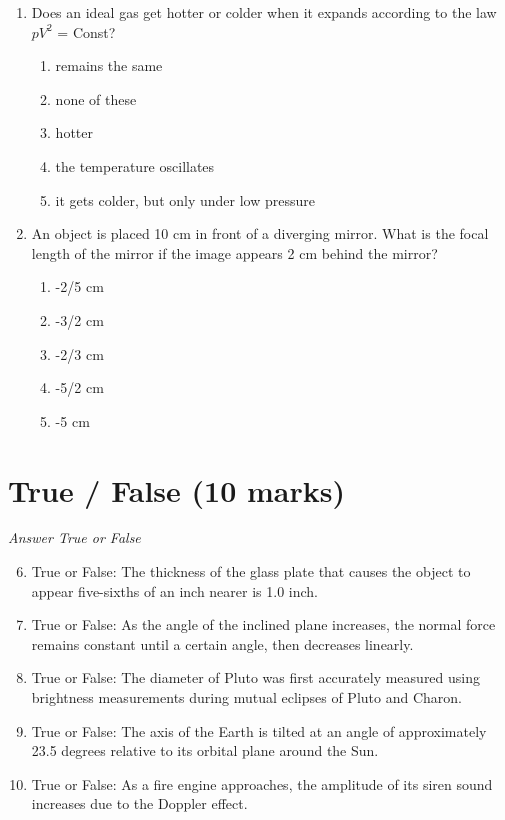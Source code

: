 \documentclass[12pt]{article}
\begin{document}
\begin{enumerate}[label=\arabic*.]
\begin{enumerate}[label=(\alph*)]
    \item only when the charge is at rest
\end{enumerate}
\item Does an ideal gas get hotter or colder when it expands according to the law $pV^2$ = Const?
\begin{enumerate}[label=(\alph*)]
    \item remains the same
    \item none of these
    \item hotter
    \item the temperature oscillates
    \item it gets colder, but only under low pressure
\end{enumerate}
\item An object is placed 10 cm in front of a diverging mirror. What is the focal length of the mirror if the image appears 2 cm behind the mirror?
\begin{enumerate}[label=(\alph*)]
    \item -2/5 cm
    \item -3/2 cm
    \item -2/3 cm
    \item -5/2 cm
    \item -5 cm
\end{enumerate}
\end{enumerate}

\section*{True / False (10 marks)}
\textit{Answer True or False}
\begin{enumerate}[label=\arabic*.]
\setcounter{enumi}{5}
\item True or False: The thickness of the glass plate that causes the object to appear five-sixths of an inch nearer is 1.0 inch.
\item True or False: As the angle of the inclined plane increases, the normal force remains constant until a certain angle, then decreases linearly.
\item True or False: The diameter of Pluto was first accurately measured using brightness measurements during mutual eclipses of Pluto and Charon.
\item True or False: The axis of the Earth is tilted at an angle of approximately 23.5 degrees relative to its orbital plane around the Sun.
\item True or False: As a fire engine approaches, the amplitude of its siren sound increases due to the Doppler effect.
\end{enumerate}
\end{document}
